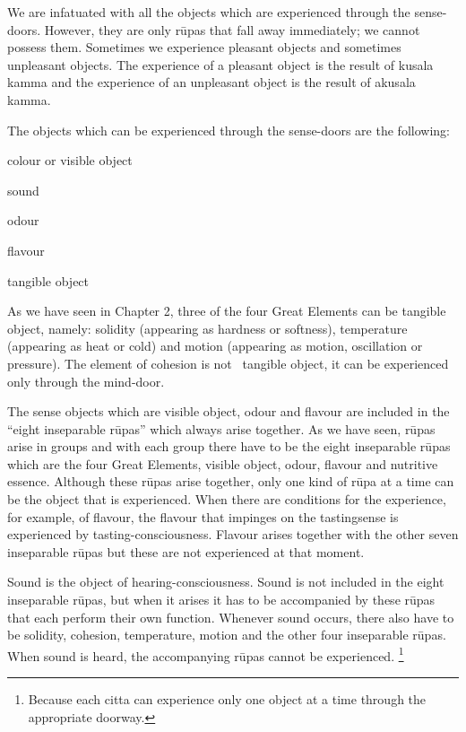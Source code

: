 \documentclass{book}
\begin{document}
We are infatuated with all the objects which are experienced through the
sense-doors. However, they are only r\=upas that fall away
immediately; we cannot possess them. Sometimes we experience pleasant
objects and sometimes unpleasant objects. The experience of a pleasant
object is the result of kusala kamma and the experience of an
unpleasant object is the result of akusala kamma. 

The objects which can be experienced through the sense-doors are the
following:




\begin{description}
\item colour or visible object

\item sound

\item odour

\item flavour 

\item tangible object
\end{description}




As we have seen in Chapter 2, three of the four Great Elements can be
tangible object, namely: solidity (appearing as hardness or softness),
temperature (appearing as heat or cold) and motion (appearing as
motion, oscillation or pressure). The element of cohesion is not
\ tangible object, it can be experienced only through the mind-door. 

The sense objects which are visible object, odour and flavour are
included in the ``eight inseparable r\=upas'' which always arise
together. As we have seen, r\=upas arise in groups and with each group
there have to be the eight inseparable r\=upas which are the four Great
Elements, visible object, odour, flavour and nutritive essence.
Although these r\=upas arise together, only one kind of r\=upa at a
time can be the object that is experienced. When there are conditions
for the experience, for example, of flavour, the flavour that impinges
on the tastingsense is experienced by tasting-consciousness. Flavour
arises together with the other seven inseparable r\=upas but these are
not experienced at that moment. 

Sound is the object of hearing-consciousness. Sound is not included in
the eight inseparable r\=upas, but when it arises it has to be
accompanied by these r\=upas that each perform their own function.
Whenever sound occurs, there also have to be solidity, cohesion,
temperature, motion and the other four inseparable r\=upas. When sound
is heard, the accompanying r\=upas cannot be experienced.
\footnote{Because each citta can experience only
one object at a time through the appropriate doorway.}
\end{document}
